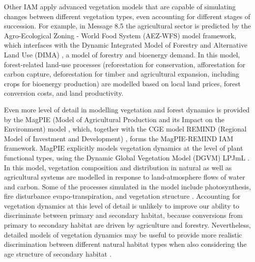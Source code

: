 \documentclass[titlesmallcaps,copyrightpage]{uomthesis}\usepackage[]{graphicx}\usepackage[]{color}
\begin{document}
Other IAM apply advanced vegetation models that are capable of simulating changes between different vegetation types, even accounting for different stages of succession. For example, in Message 8.5 the agricultural sector is predicted by the Agro-Ecological Zoning - World Food System (AEZ-WFS) model framework, which interfaces with the Dynamic Integrated Model of Forestry and Alternative Land Use (DIMA) \citep{hurtt_harmonization_2011, riahi_rcp_2011, rokityanskiy_geographically_2007}, a model of forestry and bioenergy demand. In this model, forest-related land-use processes (reforestation for conservation, afforestation for carbon capture, deforestation for timber and agricultural expansion, including crops for bioenergy production) are modelled based on local land prices, forest conversion costs, and land productivity.

Even more level of detail in modelling vegetation and forest dynamics is provided by the MagPIE (Model of Agricultural Production and its Impact on the Environment) model \citep{dietrich_magpie_2019}, which, together with the CGE model REMIND (Regional Model of Investment and Development) \citep{hilaire_remind-magpie_2020}, forms the MagPIE-REMIND IAM framework. MagPIE explicitly models vegetation dynamics at the level of plant functional types, using the Dynamic Global Vegetation Model (DGVM) LPJmL \citep[Lund–Potsdam–Jena managed Land model ,][]{bondeau_modelling_2007, sitch_evaluation_2003}. In this model, vegetation composition and distribution in natural as well as agricultural systems are modelled in response to land-atmosphere flows of water and carbon. Some of the processes simulated in the model include photosynthesis, fire disturbance evapo-transpiration, and vegetation structure \citep{bondeau_modelling_2007}. Accounting for vegetation dynamics at this level of detail is unlikely to improve our ability to discriminate between primary and secondary habitat, because conversions from primary to secondary habitat are driven by agriculture and forestry. Nevertheless, detailed models of vegetation dynamics may be useful to provide more realistic discrimination between different natural habitat types when also considering the age structure of secondary habitat \citep[see for example][]{newbold_global_2015}.
\end{document}

